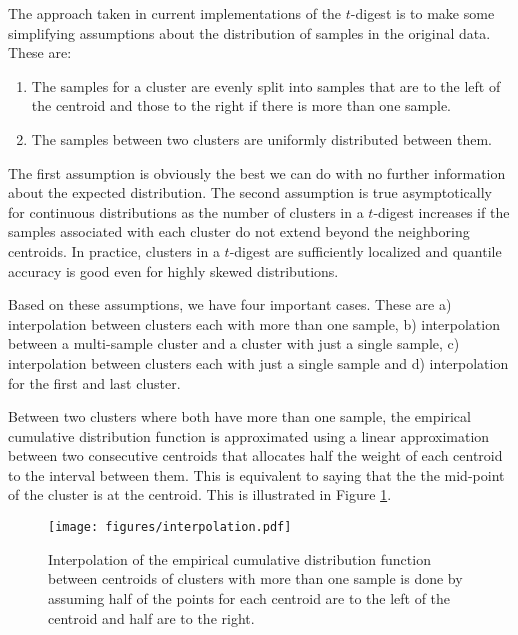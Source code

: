 \documentclass[]{statsoc}
\begin{document}
The approach taken in current implementations of the $t$-digest is to make some simplifying assumptions about the distribution of samples in the original data. These are:
\begin{enumerate}
\item The samples for a cluster are evenly split into samples that are to the left of the centroid and those to the right if there is more than one sample. 
\item The samples between two clusters are uniformly distributed between them. 
\end{enumerate}
The first assumption is obviously the best we can do with no further information about the expected distribution. The second assumption is true asymptotically for continuous distributions as the number of clusters in a $t$-digest increases if the samples associated with each cluster do not extend beyond the neighboring centroids. In practice, clusters in a $t$-digest are sufficiently localized and quantile accuracy is good even for highly skewed distributions.

Based on these assumptions, we have four important cases. These are a) interpolation between clusters each with more than one sample, b) interpolation between a multi-sample cluster and a cluster with just a single sample, c) interpolation between clusters each with just a single sample and d) interpolation for the first and last cluster.

Between two clusters where both have more than one sample, the empirical cumulative distribution function is approximated using a linear approximation between two consecutive centroids that allocates half the weight of each centroid to the interval between them. This is equivalent to saying that the the mid-point of the cluster is at the centroid. This is illustrated in Figure \ref{fig:interpolation}. 
\begin{figure}[htb] %
   \centering
   \texttt{[image: figures/interpolation.pdf]} 
   \caption{Interpolation of the empirical cumulative distribution function between centroids of clusters with more than one sample is done by assuming half of the points for each centroid are to the left of the centroid and half are to the right. }
   \label{fig:interpolation}
\end{figure}
\end{document}
